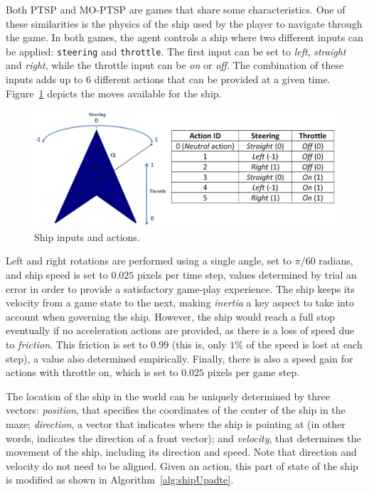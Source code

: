 \documentclass[conference]{IEEEtran}
\begin{document}
Both PTSP and MO-PTSP are games that share some characteristics. One of these similarities is the physics of the ship used by the player to navigate through the game. In both games, the agent controls a ship where two different inputs can be applied: \texttt{steering} and \texttt{throttle}. The first input can be set to \textit{left}, \textit{straight} and \textit{right}, while the throttle input can be \textit{on} or \textit{off}. The combination of these inputs adds up to $6$ different actions that can be provided at a given time. Figure~\ref{fig:ship} depicts the moves available for the ship.

\begin{figure} [!h]
	\begin{center}
	\includegraphics[scale=0.14]{img/ShipActions}
	\caption{Ship inputs and actions.}
	\label{fig:ship}
	\end{center}
\end{figure}

Left and right rotations are performed using a single angle, set to $\pi/60$ radians, and ship speed is set to $0.025$ pixels per time step, values determined by trial an error in order to provide a satisfactory game-play experience. The ship keeps its velocity from a game state to the next, making \textit{inertia} a key aspect to take into account when governing the ship. However, the ship would reach a full stop eventually if no acceleration actions are provided, as there is a loss of speed due to \textit{friction}. This friction is  set to $0.99$ (this is, only $1\%$ of the speed is lost at each step), a value also determined empirically. Finally, there is also a speed gain for actions with throttle on, which is set to $0.025$ pixels per game step. 

The location of the ship in the world can be uniquely determined by three vectors: \textit{position}, that specifies the coordinates of the center of the ship in the maze; \textit{direction}, a vector that indicates where the ship is pointing at (in other words, indicates the direction of a front vector); and \textit{velocity}, that determines the movement of the ship, including its direction and speed. Note that direction and velocity do not need to be aligned. Given an action, this part of state of the ship is modified as shown in Algorithm~\ref{alg:shipUpadte}.
\end{document}

